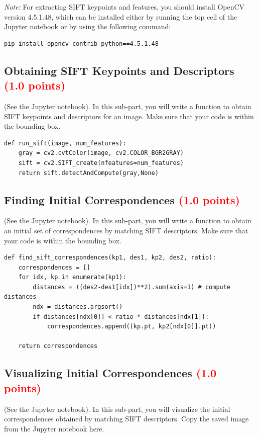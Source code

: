 \documentclass[answers]{exam}
\newcommand{\mypoints}[1]{\textcolor{red}{(#1 points)}}
\begin{document}
\emph{Note:} For extracting SIFT keypoints and features, you should install OpenCV version 4.5.1.48, which can be installed either by running the top cell of the Jupyter notebook or by using the following command: 
\begin{verbatim}
pip install opencv-contrib-python==4.5.1.48
\end{verbatim}

\subsection{Obtaining SIFT Keypoints and Descriptors \mypoints{1.0}}
(See the Jupyter notebook). In this sub-part, you will write a function to obtain SIFT keypoints and descriptors for an image. Make sure that your code is within the bounding box.

\begin{solution}
\begin{verbatim}
def run_sift(image, num_features):
    gray = cv2.cvtColor(image, cv2.COLOR_BGR2GRAY)
    sift = cv2.SIFT_create(nfeatures=num_features)
    return sift.detectAndCompute(gray,None)
\end{verbatim}
\end{solution}

\subsection{Finding Initial Correspondences \mypoints{1.0}}
(See the Jupyter notebook). In this sub-part, you will write a function to obtain an initial set of correspondences by matching SIFT descriptors. Make sure that your code is within the bounding box.

\begin{solution}
\begin{verbatim}
def find_sift_correspondences(kp1, des1, kp2, des2, ratio):
    correspondences = []
    for idx, kp in enumerate(kp1):
        distances = ((des2-des1[idx])**2).sum(axis=1) # compute distances
        ndx = distances.argsort()
        if distances[ndx[0]] < ratio * distances[ndx[1]]:
            correspondences.append((kp.pt, kp2[ndx[0]].pt))

    return correspondences
\end{verbatim}
\end{solution}

\subsection{Visualizing Initial Correspondences \mypoints{1.0}}
(See the Jupyter notebook). In this sub-part, you will visualize the initial correspondences obtained by matching SIFT descriptors. Copy the saved image from the Jupyter notebook here.
\end{document}
